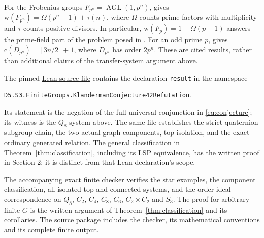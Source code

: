 \documentclass[11pt]{article}
\begin{document}
For the Frobenius groups $F_{p^n}=\operatorname{AGL}(1,p^n)$,
\cite[Theorem 3.2]{CG} gives
$\mathrm w(F_{p^n})=\Omega(p^n-1)+\tau(n)$, where $\Omega$ counts
prime factors with multiplicity and $\tau$ counts positive divisors.
In particular, $\mathrm w(F_p)=1+\Omega(p-1)$ answers the prime-field
part of the problem posed in \cite[Section 3.3, p.~13]{K}.
For an odd prime $p$, \cite[Theorem 4.11]{CG} gives
$\mathrm c(D_{p^n})=\lfloor3n/2\rfloor+1$, where $D_{p^n}$ has
order $2p^n$. These are cited results, rather than additional claims of
the transfer-system argument above.

The pinned
\href{https://github.com/the-omega-institute/trureturing/blob/8acba483bc80695fef00c6b8c491e2ae16d5145f/D5/S3/FiniteGroups/KlandermanConjecture42Refutation.lean}{Lean source file}
contains the declaration \texttt{result} in the namespace
\begin{center}\small
\texttt{D5.S3.FiniteGroups.KlandermanConjecture42Refutation}.
\end{center}
Its statement is the negation of the full universal conjunction in
\eqref{eq:conjecture}; its witness is the $Q_8$ system above.
The same file establishes the strict quaternion subgroup chain,
the two actual graph components, top isolation, and the exact ordinary
generated relation. The general classification in
Theorem~\ref{thm:classification}, including its LSP equivalence, has the
written proof in Section 2; it is distinct from that Lean declaration's scope.

The accompanying exact finite checker verifies the star examples, the
component classification, all isolated-top and connected systems, and the
order-ideal correspondence on $Q_8$, $C_2$, $C_4$, $C_8$, $C_6$,
$C_2\times C_2$ and $S_3$.
The proof for arbitrary finite $G$ is the written argument of
Theorem~\ref{thm:classification} and its corollaries. The source package includes the checker,
its mathematical conventions and its complete finite output.
\end{document}
